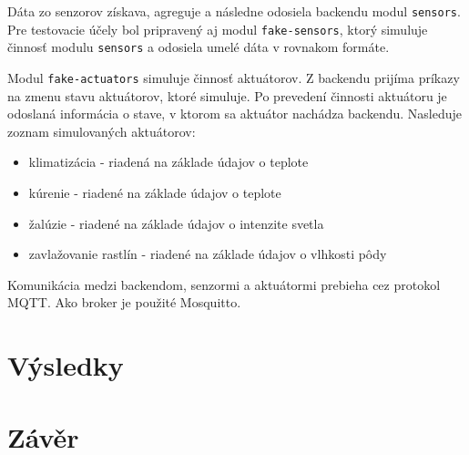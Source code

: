 \documentclass[11pt,a4paper]{article}
\begin{document}
Dáta zo senzorov získava, agreguje a následne odosiela backendu modul \texttt{sensors}.
Pre testovacie účely bol pripravený aj modul \texttt{fake-sensors}, ktorý simuluje
činnosť modulu \texttt{sensors} a odosiela umelé dáta v rovnakom formáte.

Modul \texttt{fake-actuators} simuluje činnosť aktuátorov.
Z backendu prijíma príkazy na zmenu stavu aktuátorov, ktoré simuluje.
Po prevedení činnosti aktuátoru je odoslaná informácia o stave, v ktorom
sa aktuátor nachádza backendu.
Nasleduje zoznam simulovaných aktuátorov:
\begin{itemize}
    \item klimatizácia - riadená na základe údajov o teplote
    \item kúrenie - riadené na základe údajov o teplote
    \item žalúzie - riadené na základe údajov o intenzite svetla
    \item zavlažovanie rastlín - riadené na základe údajov o vlhkosti pôdy
\end{itemize}

Komunikácia medzi backendom, senzormi a aktuátormi prebieha cez protokol MQTT.
Ako broker je použité Mosquitto.

\section{Výsledky}\label{sec:res}

\section{Závěr}\label{sec:sum}
\end{document}
